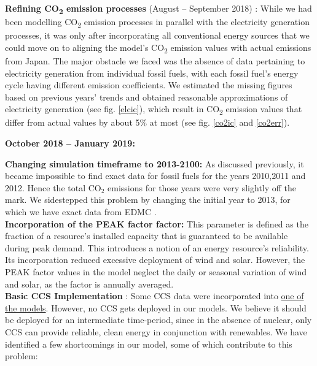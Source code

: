 \documentclass[14pt,a4paper]{article} %
\begin{document}
\textbf{Refining CO\textsubscript{2} emission processes} (August – September 2018) : While we had been modelling CO\textsubscript{2} emission processes in parallel with the electricity generation processes, it was only after incorporating all conventional energy sources that we could move on to aligning the model's CO\textsubscript{2} emission values with actual emissions from Japan. The major obstacle we faced was the absence of data pertaining to electricity generation from individual fossil fuels, with each fossil fuel's energy cycle having different emission coefficients. We estimated the missing figures based on previous years' trends \cite{noauthor_energy_2018,noauthor_national_2018} and obtained reasonable approximations of electricity generation (see fig. \ref{elcic}), which result in CO\textsubscript{2} emission values that differ from actual values by about 5\% at most (see fig. \ref{co2ic} and \ref{co2err}).\\

\begin{flushleft}
\textbf{October 2018 – January 2019:}
\end{flushleft}

\textbf{Changing simulation timeframe to 2013-2100:} As discussed previously, it became impossible to find exact data for fossil fuels for the years 2010,2011 and 2012. Hence the total CO$_2$ emissions for those years were very slightly off the mark. We sidestepped this problem by changing the initial year to 2013, for which we have exact data from \gls{EDMC} \cite{noauthor_energy_2018}.\\

\textbf{Incorporation of the \gls{PEAK} factor \cite{gargiulo_documentation_2005} factor:} This parameter is defined as the fraction of a resource's installed capacity that is guaranteed to be available during peak demand. This introduces a notion of an energy resource's reliability. Its incorporation reduced excessive deployment of wind and solar. However, the \gls{PEAK} factor values in the model \cite{kato_energy_2016} neglect the daily or seasonal variation of wind and solar, as the factor is annually averaged.\\

\textbf{Basic \gls{CCS} Implementation} : Some \gls{CCS} data \cite{kato_energy_2016}  were incorporated into \href{https://github.com/arfc/i2cner/tree/master/JPN-Main-Model/active/i2cner-nonuc}{one of the models}. However, no \gls{CCS} gets deployed in our models. We believe  it should be deployed for an intermediate time-period, since in the absence of nuclear, only \gls{CCS} can provide reliable, clean energy in conjunction with renewables. We have identified a few shortcomings in our model, some of which contribute to this problem:\\
\end{document}
